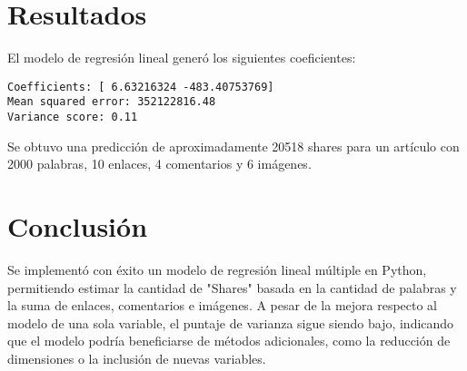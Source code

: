 \documentclass{article}
\begin{document}
\section{Resultados}
El modelo de regresi\'on lineal gener\'o los siguientes coeficientes:
\begin{verbatim}
Coefficients: [ 6.63216324 -483.40753769]
Mean squared error: 352122816.48
Variance score: 0.11
\end{verbatim}

Se obtuvo una predicci\'on de aproximadamente 20518 shares para un art\'iculo con 2000 palabras, 10 enlaces, 4 comentarios y 6 im\'agenes.

\section{Conclusi\'on}
Se implement\'o con \'exito un modelo de regresi\'on lineal m\'ultiple en Python, permitiendo estimar la cantidad de "Shares" basada en la cantidad de palabras y la suma de enlaces, comentarios e im\'agenes. A pesar de la mejora respecto al modelo de una sola variable, el puntaje de varianza sigue siendo bajo, indicando que el modelo podr\'ia beneficiarse de m\'etodos adicionales, como la reducci\'on de dimensiones o la inclusi\'on de nuevas variables.
\end{document}
